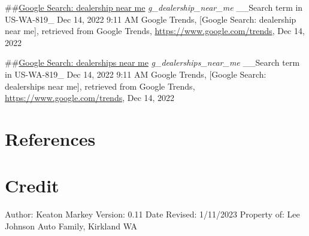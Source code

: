 \documentclass[
]{article}
\begin{document}
\#\#\href{https://trends.google.com/trends/explore?q=dealership\%20near\%20me\&geo=US-WA-819}{Google
Search: dealership near me} \emph{g\_dealership\_near\_me} \_\_Search
term in US-WA-819\_ Dec 14, 2022 9:11 AM Google Trends, {[}Google
Search: dealership near me{]}, retrieved from Google Trends,
\url{https://www.google.com/trends}, Dec 14, 2022

\#\#\href{https://trends.google.com/trends/explore?q=dealerships\%20near\%20me\&geo=US-WA-819}{Google
Search: dealerships near me} \emph{g\_dealerships\_near\_me} \_\_Search
term in US-WA-819\_ Dec 14, 2022 9:11 AM Google Trends, {[}Google
Search: dealerships near me{]}, retrieved from Google Trends,
\url{https://www.google.com/trends}, Dec 14, 2022

\hypertarget{references}{%
\section{References}\label{references}}

\hypertarget{credit}{%
\section{Credit}\label{credit}}

Author: Keaton Markey Version: 0.11 Date Revised: 1/11/2023 Property of:
Lee Johnson Auto Family, Kirkland WA
\end{document}
